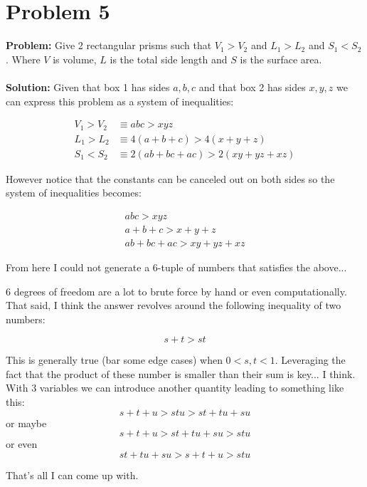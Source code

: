 \documentclass{article}
\begin{document}
\section{Problem 5}
\textbf{Problem:} Give 2 rectangular prisms such that $V_1>V_2$ and $L_1>L_2$ and $S_1<S_2$. Where $V$ is volume, $L$ is the total side length and $S$ is the surface area.
\\\\
\textbf{Solution:} Given that box 1 has sides $a,b,c$ and that box 2 has sides $x,y,z$ we can express this problem as a system of inequalities:

\begin{align*}
V_1>V_2&\equiv abc>xyz\\
L_1>L_2&\equiv 4(a+b+c)>4(x+y+z)\\
S_1<S_2&\equiv 2(ab+bc+ac)>2(xy+yz+xz)
\end{align*}

However notice that the constants can be canceled out on both sides so the system of inequalities becomes:

\begin{gather*}
abc>xyz\\
a+b+c>x+y+z\\
ab+bc+ac>xy+yz+xz
\end{gather*}

From here I could not generate a $6$-tuple of numbers that satisfies the above...

6 degrees of freedom are a lot to brute force by hand or even computationally. That said, I think the answer revolves around the following inequality of two numbers:

$$s+t>st$$

This is generally true (bar some edge cases) when $0<s,t<1$. Leveraging the fact that the product of these number is smaller than their sum is key... I think. With 3 variables we can introduce another quantity leading to something like this:
$$s+t+u>stu>st+tu+su$$
or maybe
$$s+t+u>st+tu+su>stu$$
or even
$$st+tu+su>s+t+u>stu$$

That's all I can come up with.
\end{document}
